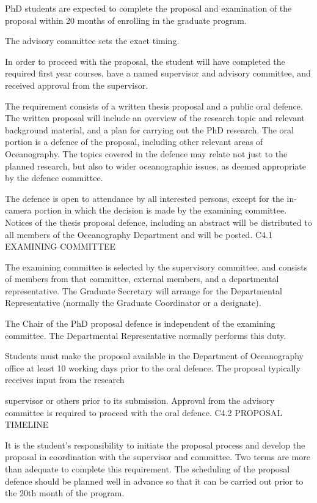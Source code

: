 \documentclass{article}
\begin{document}
PhD students are expected to complete the proposal and examination of the proposal within 20 months of enrolling in the graduate program.

The advisory committee sets the exact timing.

In order to proceed with the proposal, the student will have completed the required first year courses, have a named supervisor and advisory committee, and received approval from the supervisor.

The requirement consists of a written thesis proposal and a public oral defence.  The written proposal will include an overview of the research topic and relevant background material, and a plan for carrying out the PhD research. The oral portion is a defence of the proposal, including other relevant areas of Oceanography. The topics covered in the defence may relate not just to the planned research, but also to wider oceanographic issues, as deemed appropriate by the defence committee.

The defence is open to attendance by all interested persons, except for the in-camera portion in which the decision is made by the examining committee. Notices of the thesis proposal defence, including an abstract will be distributed to all members of the Oceanography Department and will be posted.
C4.1	EXAMINING COMMITTEE

The examining committee is selected by the supervisory committee, and consists of members from that committee, external members, and a departmental representative. The Graduate Secretary will arrange for the Departmental Representative (normally the Graduate Coordinator or a designate).

The Chair of the PhD proposal defence is independent of the examining committee. The Departmental Representative normally performs this duty.

Students must make the proposal available in the Department of Oceanography office at least 10 working days prior to the oral defence.  The proposal typically receives input from the research
 

supervisor or others prior to its submission. Approval from the advisory committee is required to proceed with the oral defence.
C4.2	PROPOSAL TIMELINE

It is the student's responsibility to initiate the proposal process and develop the proposal in coordination with the supervisor and committee. Two terms are more than adequate to complete this requirement. The scheduling of the proposal defence should be planned well in advance so that it can be carried out prior to the 20th month of the program.
\end{document}
